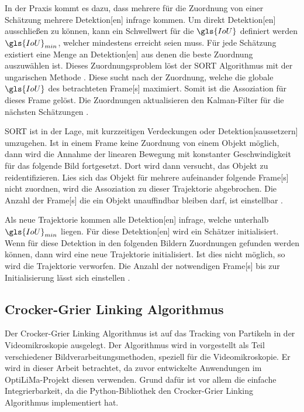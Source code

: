 In der Praxis kommt es dazu, dass mehrere für die Zuordnung von einer Schätzung mehrere \gls{Detektion}[en] infrage kommen. Um direkt \gls{Detektion}[en] ausschließen zu können, kann ein Schwellwert für die \(\gls{IoU}\) definiert werden \(\gls{IoU}_{min}\), welcher mindestens erreicht seien muss. Für jede Schätzung existiert eine Menge an \gls{Detektion}[en] aus denen die beste Zuordnung auszuwählen ist. Dieses Zuordnungsproblem löst der \acrshort{SORT} Algorithmus mit der ungarischen Methode \cite{Kuhn.1955}. Diese sucht nach der Zuordnung, welche die globale \(\gls{IoU}\) des betrachteten \gls{Frame}[s] maximiert. Somit ist die \gls{Assoziation} für dieses \gls{Frame} gelöst. Die Zuordnungen aktualisieren den Kalman-Filter für die nächsten Schätzungen \cite{Bewley.2016}. \par

\acrshort{SORT} ist in der Lage, mit kurzzeitigen Verdeckungen oder \gls{Detektion}[saussetzern] umzugehen. Ist in einem \gls{Frame} keine Zuordnung von einem Objekt möglich, dann wird die Annahme der linearen Bewegung mit konstanter Geschwindigkeit für das folgende Bild fortgesetzt. Dort wird dann versucht, das Objekt zu reidentifizieren. Lies sich das Objekt für mehrere aufeinander folgende \gls{Frame}[s] nicht zuordnen, wird die \gls{Assoziation} zu dieser \gls{Trajektorie} abgebrochen. Die Anzahl der \gls{Frame}[s] die ein Objekt unauffindbar bleiben darf, ist einstellbar \cite{Bewley.2016}.\par

Als neue \gls{Trajektorie} kommen alle \gls{Detektion}[en] infrage, welche unterhalb \(\gls{IoU}_{min}\) liegen. Für diese \gls{Detektion}[en] wird ein Schätzer initialisiert. Wenn für diese \gls{Detektion} in den folgenden Bildern Zuordnungen gefunden werden können, dann wird eine neue \gls{Trajektorie} initialisiert. Ist dies nicht möglich, so wird die \gls{Trajektorie} verworfen. Die Anzahl der notwendigen \gls{Frame}[s] bis zur Initialisierung lässt sich einstellen \cite{Bewley.2016}.

\subsection{Crocker-Grier Linking Algorithmus} \label{sec:MOT CrockGrier}
Der Crocker-Grier Linking Algorithmus ist auf das Tracking von Partikeln in der Videomikroskopie ausgelegt. Der Algorithmus wird in \cite{Crocker.1996} vorgestellt als Teil verschiedener Bildverarbeitungsmethoden, speziell für die Videomikroskopie. Er wird in dieser Arbeit betrachtet, da zuvor entwickelte Anwendungen im \acrshort{OptiLiMa}-Projekt diesen verwenden. Grund dafür ist vor allem die einfache Integrierbarkeit, da die \gls{Python}-\gls{Bibliothek} \cite{Allan.2023} den Crocker-Grier Linking Algorithmus implementiert hat.\par

